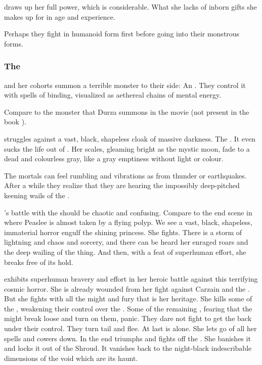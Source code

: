 \Achsah{} draws up her full power, which is considerable. 
What she lacks of inborn gifts she makes up for in age and experience. 


Perhaps they fight in humanoid form first before going into their monstrous forms. 





\subsubsection{The \umbra}
\Achsah and her \resphan cohorts summon a terrible monster to their side: 
An . 
They control it with spells of binding, visualized as aethereal {chains} of mental energy. 

Compare to the monster that Durza summons in the movie \cite{Movie:Eragon} (not present in the book \cite{ChristopherPaolini:Eragon}). 

\Nzessuacrith struggles against a vast, black, shapeless cloak of massive darkness.
The \umbra {}.
It even sucks the life out of \Nzessuacrith.
Her scales, gleaming bright as the mystic moon, fade to a dead and colourless gray, like a gray emptiness without light or colour. 

The mortals can feel rumbling and vibrations as from thunder or earthquakes.
After a while they realize that they are hearing the impossibly deep-pitched keening wails of the \umbra. 

\Nzessuacrith's battle with the \umbra should be chaotic and confusing. 
Compare to the end scene in \cite{HPLovecraft:TheShadowOutofTime} where Peaslee is almost taken by a flying polyp. 
We see a vast, black, shapeless, immaterial horror engulf the shining \dragon princess. 
She fights. 
There is a storm of lightning and chaos and sorcery, and there can be heard her enraged roars and the deep wailing of the thing.
And then, with a feat of superhuman effort, she breaks free of its hold. 

\Nzessuacrith exhibits superhuman bravery and effort in her heroic battle against this terrifying cosmic horror. 
She is already wounded from her fight against Carzain \Shachar and the \resphain.
But she fights with all the might and fury that is her \draconian heritage.
She kills some of the \resphain, weakening their control over the \umbra.
Some of the remaining \resphain, fearing that the \umbra might break loose and turn on them, panic.
They dare not fight to get the \umbra back under their control.
They turn tail and flee.
At last \Achsah is alone.
She lets go of all her spells and cowers down.
In the end \Nzessuacrith triumphs and fights off the \umbra.
She banishes it and locks it out of the Shroud.
It vanishes back to the night-black indescribable dimensions of the void which are its haunt. 

